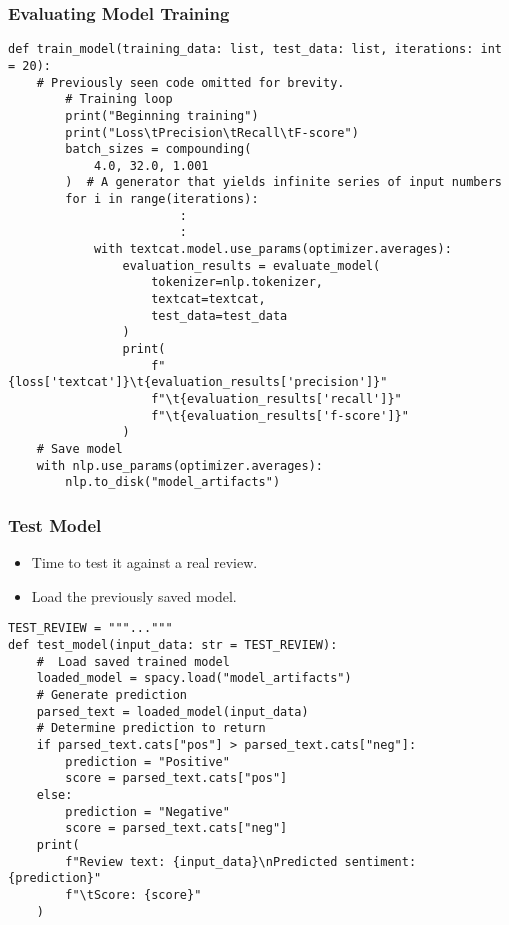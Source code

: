 \begin{frame}[fragile]\frametitle{Evaluating Model Training }

\begin{lstlisting}
def train_model(training_data: list, test_data: list, iterations: int = 20):
    # Previously seen code omitted for brevity.
        # Training loop
        print("Beginning training")
        print("Loss\tPrecision\tRecall\tF-score")
        batch_sizes = compounding(
            4.0, 32.0, 1.001
        )  # A generator that yields infinite series of input numbers
        for i in range(iterations):
						:
						:
            with textcat.model.use_params(optimizer.averages):
                evaluation_results = evaluate_model(
                    tokenizer=nlp.tokenizer,
                    textcat=textcat,
                    test_data=test_data
                )
                print(
                    f"{loss['textcat']}\t{evaluation_results['precision']}"
                    f"\t{evaluation_results['recall']}"
                    f"\t{evaluation_results['f-score']}"
                )		
    # Save model
    with nlp.use_params(optimizer.averages):
        nlp.to_disk("model_artifacts")								
\end{lstlisting}

\end{frame}

\begin{frame}[fragile]\frametitle{Test Model}

\begin{itemize}
\item Time to test it against a real review.
\item Load the previously saved model.
\end{itemize}

\begin{lstlisting}
TEST_REVIEW = """..."""				
def test_model(input_data: str = TEST_REVIEW):
    #  Load saved trained model
    loaded_model = spacy.load("model_artifacts")
    # Generate prediction
    parsed_text = loaded_model(input_data)
    # Determine prediction to return
    if parsed_text.cats["pos"] > parsed_text.cats["neg"]:
        prediction = "Positive"
        score = parsed_text.cats["pos"]
    else:
        prediction = "Negative"
        score = parsed_text.cats["neg"]
    print(
        f"Review text: {input_data}\nPredicted sentiment: {prediction}"
        f"\tScore: {score}"
    )			
\end{lstlisting}

\end{frame}

